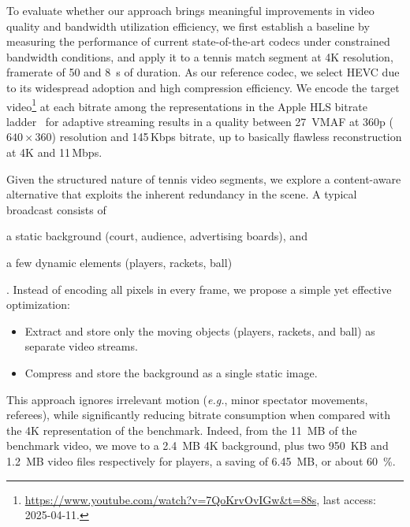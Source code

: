 \documentclass[manuscript, screen]{acmart}
\newcommand{\eg}{\emph{e.g.}, }
\newcommand{\vxv}[2]{$#1\!\times\!#2$}
\begin{document}

To evaluate whether our approach brings meaningful improvements in video quality and bandwidth utilization efficiency, we first establish a baseline by measuring the performance of current state-of-the-art codecs under constrained bandwidth conditions, and apply it to a tennis match segment at 4K resolution, framerate of \SI{50}{\fps} and \SI{8}{\second} of duration.
As our reference codec, we select HEVC due to its widespread adoption and high compression efficiency. 
We encode the target video\footnote{\url{https://www.youtube.com/watch?v=7QoKrvOvIGw&t=88s}, last access: 2025-04-11.} at each bitrate among the representations in the Apple HLS bitrate ladder~\cite{AppleHLS} for adaptive streaming results in a quality between \SI{27}{VMAF} at 360p (\vxv{640}{360}) resolution and 145\,Kbps bitrate, up to basically flawless reconstruction at 4K and 11\,Mbps. 

Given the structured nature of tennis video segments, we explore a content-aware alternative that exploits the inherent redundancy in the scene. 
A typical broadcast consists of 
\begin{enumerate*}[label=\textit{(\roman*)}] 
\item a static background (court, audience, advertising boards), and 
\item a few dynamic elements (players, rackets, ball)
\end{enumerate*}.
Instead of encoding all pixels in every frame, we propose a simple yet effective optimization:
\begin{itemize}[topsep=0pt,itemsep=0pt,leftmargin=*]
    \item Extract and store only the moving objects (players, rackets, and ball) as separate video streams.
    \item Compress and store the background as a single static image.
\end{itemize}
This approach ignores irrelevant motion (\eg minor spectator movements, referees), while significantly reducing bitrate consumption when compared with the 4K representation of the benchmark.
Indeed, from the \SI{11}{MB} of the benchmark video, we move to a \SI{2.4}{MB} 4K background, plus two \SI{950}{KB} and \SI{1.2}{MB} video files respectively for players, a saving of \SI{6.45}{MB}, or about \qty{60}{\percent}.
\end{document}
